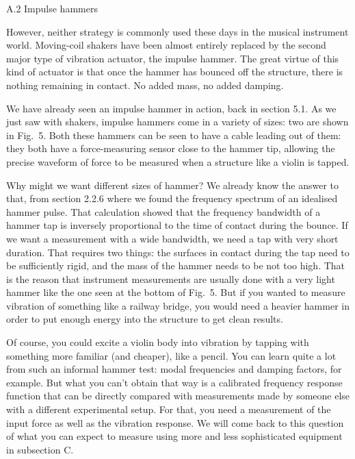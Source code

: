   A.2 Impulse hammers 

  However, neither strategy is commonly used these days in the musical 
  instrument world. Moving-coil shakers have been almost entirely replaced by 
  the second major type of vibration actuator, the impulse hammer. The great 
  virtue of this kind of actuator is that once the hammer has bounced off the 
  structure, there is nothing remaining in contact. No added mass, no added 
  damping. 

  We have already seen an impulse hammer in action, back in section 5.1. As we 
  just saw with shakers, impulse hammers come in a variety of sizes: two are 
  shown in Fig.\ 5. Both these hammers can be seen to have a cable leading out 
  of them: they both have a force-measuring sensor close to the hammer tip, 
  allowing the precise waveform of force to be measured when a structure like a 
  violin is tapped. 

  Why might we want different sizes of hammer? We already know the answer to 
  that, from section 2.2.6 where we found the frequency spectrum of an 
  idealised hammer pulse. That calculation showed that the frequency bandwidth 
  of a hammer tap is inversely proportional to the time of contact during the 
  bounce. If we want a measurement with a wide bandwidth, we need a tap with 
  very short duration. That requires two things: the surfaces in contact during 
  the tap need to be sufficiently rigid, and the mass of the hammer needs to be 
  not too high. That is the reason that instrument measurements are usually 
  done with a very light hammer like the one seen at the bottom of Fig.\ 5. But 
  if you wanted to measure vibration of something like a railway bridge, you 
  would need a heavier hammer in order to put enough energy into the structure 
  to get clean results. 

  Of course, you could excite a violin body into vibration by tapping with 
  something more familiar (and cheaper), like a pencil. You can learn quite a 
  lot from such an informal hammer test: modal frequencies and damping factors, 
  for example. But what you can’t obtain that way is a calibrated frequency 
  response function that can be directly compared with measurements made by 
  someone else with a different experimental setup. For that, you need a 
  measurement of the input force as well as the vibration response. We will 
  come back to this question of what you can expect to measure using more and 
  less sophisticated equipment in subsection C. 

